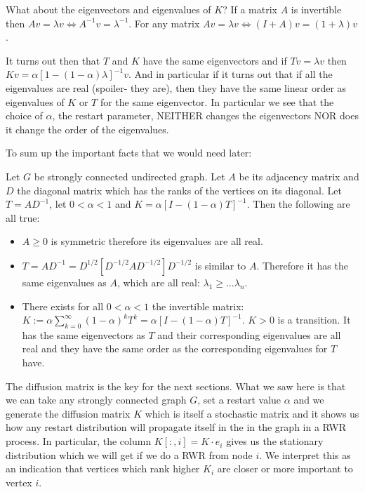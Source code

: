 What about the eigenvectors and eigenvalues of $K$?
If a matrix $A$ is invertible then $Av = \lambda v \iff A^{-1}v = \lambda^{-1}$.
For any matrix $Av = \lambda v \iff (I + A)v = (1+\lambda)v$.

It turns out then that $T$ and $K$ have the same eigenvectors and if $Tv=\lambda
v$ then $K v = \alpha [1 - (1 - \alpha) \lambda]^{-1} v$. And in particular if it
turns out that if all the eigenvalues are real (spoiler- they are), then they have
the same linear order as eigenvalues of $K$ or $T$ for the same eigenvector.
In particular we see that the choice of $\alpha$, the restart parameter, NEITHER 
changes the eigenvectors NOR does it change the order of the eigenvalues.

To sum up the important facts that we would need later:

\begin{thm}
\label{thm:AKTcharacteristics}
Let $G$ be strongly connected undirected graph. Let $A$ be its adjacency matrix
and $D$ the diagonal matrix which has the ranks of the vertices on its diagonal.
Let $T = A D^{-1}$, let $0 \lt \alpha \lt 1$ and 
$K = \alpha [I - (1 - \alpha)T]^{-1}$. Then the following are all true:

\begin{itemize}

\item{}
$A \geq 0$ is symmetric therefore its eigenvalues are all real.

\item{}
$T = AD^{-1} = D^{1/2}[D^{-1/2}AD^{-1/2}]D^{-1/2}$ is similar to $A$. Therefore
it has the same eigenvalues as $A$, which are all real:
$\lambda_1 \geq \dots \lambda_n$.

\item{}
There exists for all $0 \lt \alpha \lt 1$ the invertible matrix: 
$K := \alpha \sum_{k=0}^{\infty} (1 - \alpha)^k T^k = \alpha [I - (1 -
\alpha)T]^{-1}$.
$K \gt 0$ is a transition. It has the same eigenvectors as $T$ and their
corresponding eigenvalues are all real and they have the same order as the
corresponding eigenvalues for $T$ have.
\end{itemize}
\end{thm}

The diffusion matrix is the key for the next sections.
What we saw here is that we can take any strongly connected
graph $G$, set a restart value $\alpha$ and we generate the 
diffusion matrix $K$ which is itself a stochastic matrix and it
shows us how any restart distribution will propagate itself in the
in the graph in a RWR process. In particular, the column $K[:,i] = K
\cdot e_i$ gives us the stationary distribution which we will get if
we do a RWR from node $i$. We interpret this as an indication that
vertices which rank higher $K_i$ are closer or more important to 
vertex $i$.

